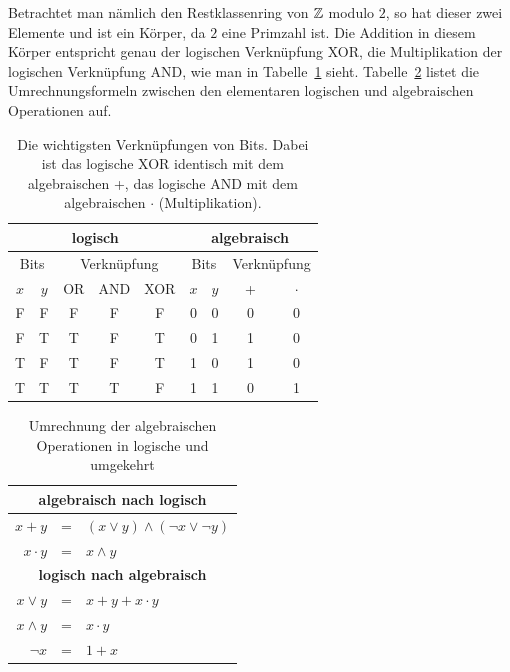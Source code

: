 \begin{refsegment}
Betrachtet man nämlich den Restklassenring von $\mathbb{Z}$ modulo $2$, so
hat dieser zwei Elemente und ist ein Körper,
da $2$ eine Primzahl ist. Die Addition in diesem Körper
entspricht genau der logischen Verknüpfung XOR,
die Multiplikation der logischen Verknüpfung AND,
wie man in Tabelle~\ref{t-bool-xor} sieht. Tabelle~\ref{t-bool-trf}
listet die Umrechnungsformeln zwischen den elementaren logischen
und algebraischen Operationen auf.

\begin{table}[h]
\begin{center}
\begin{tabular}{|cc|ccc||cc|cc|} \hline
   \multicolumn{5}{|c||}{\textbf{logisch}} & \multicolumn{4}{c|}{\textbf{algebraisch}} \\ \hline
   \multicolumn{2}{|c|}{Bits} & \multicolumn{3}{|c||}{Verknüpfung} &
        \multicolumn{2}{|c|}{Bits} & \multicolumn{2}{|c|}{Verknüpfung} \\ \hline
   $x$ & $y$ & OR & AND & XOR & $x$ & $y$ & + & $\cdot$ \\ \hline
    F  &  F  & F  &  F  &  F  &  0  &  0  &  0  &  0    \\
    F  &  T  & T  &  F  &  T  &  0  &  1  &  1  &  0    \\
    T  &  F  & T  &  F  &  T  &  1  &  0  &  1  &  0    \\
    T  &  T  & T  &  T  &  F  &  1  &  1  &  0  &  1    \\
   \hline
\end{tabular}
\end{center}
\caption{Die wichtigsten Verknüpfungen von Bits. Dabei ist das logische
  XOR identisch mit dem algebraischen +, das logische AND mit dem
  algebraischen $\cdot$ (Multiplikation).}\label{t-bool-xor}
\end{table}

\begin{table}[h]
\begin{center}
\begin{tabular}{|rcl|} \hline
   \multicolumn{3}{|c|}{\textbf{algebraisch nach logisch}}          \\ \hline
   $x + y$      & = & $(x \vee y) \wedge (\neg x \vee \neg y)$ \\
   $x \cdot y$  & = & $x \wedge y$                             \\ \hline \hline
   \multicolumn{3}{|c|}{\textbf{logisch nach algebraisch}}          \\ \hline
   $x \vee y$   & = & $x + y + x\cdot y$                       \\
   $x \wedge y$ & = & $x \cdot y$                              \\
   $\neg x$     & = & $1 + x$                                  \\ \hline
\end{tabular}
\end{center}
\caption{Umrechnung der algebraischen Operationen in logische und umgekehrt}\label{t-bool-trf}
\end{table}


\end{refsegment}
